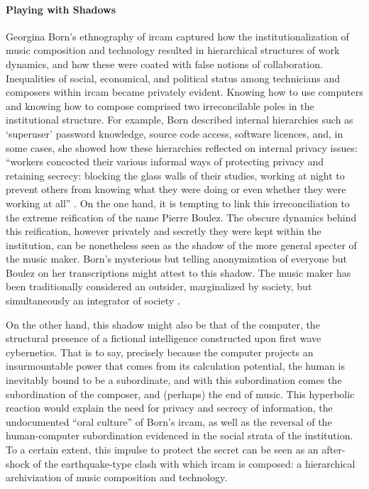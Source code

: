 \paragraph{Playing with Shadows}
Georgina Born's ethnography of \gls{ircam} \parencite{Bor95:Rat} captured how the institutionalization of music composition and technology resulted in hierarchical structures of work dynamics, and how these were coated with false notions of collaboration. Inequalities of social, economical, and political status among technicians and composers within \gls{ircam} became privately evident. Knowing how to use computers and knowing how to compose comprised two irreconcilable poles in the institutional structure. For example, Born described internal hierarchies such as `superuser' password knowledge, source code access, software licences, and, in some cases, she showed how these hierarchies reflected on internal privacy issues: ``workers concocted their various informal ways of protecting privacy and retaining secrecy: blocking the glass walls of their studies, working at night to prevent others from knowing what they were doing or even whether they were working at all'' \parencite[272]{Bor95:Rat}. On the one hand, it is tempting to link this irreconciliation to the extreme reification of the name Pierre Boulez. The obscure dynamics behind this reification, however privately and secretly they were kept within the institution, can be nonetheless seen as the shadow of the more general specter of the music maker. Born's mysterious but telling anonymization of everyone but Boulez on her transcriptions might attest to this shadow. The music maker has been traditionally considered an outsider, marginalized by society, but simultaneously an integrator of society \parencite[12]{Att77:Noi}. 

On the other hand, this shadow might also be that of the computer, the structural presence of a fictional intelligence constructed upon first wave cybernetics. That is to say, precisely because the computer projects an insurmountable power that comes from its calculation potential, the human is inevitably bound to be a subordinate, and with this subordination comes the subordination of the composer, and (perhaps) the end of music. This hyperbolic reaction would explain the need for privacy and secrecy of information, the undocumented ``oral culture'' of Born's \gls{ircam}, as well as the reversal of the human-computer subordination evidenced in the social strata of the institution. To a certain extent, this impulse to protect the secret can be seen as an after-shock of the earthquake-type clash with which \gls{ircam} is composed: a hierarchical archivization of music composition and technology.

